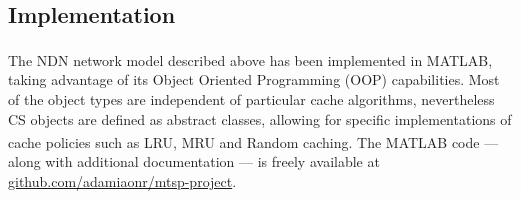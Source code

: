 \subsection{Implementation}
\label{subsec:meth-impl}

The NDN network model described above has been implemented in MATLAB\textsuperscript{\textregistered}, taking 
advantage of its Object Oriented Programming (OOP) capabilities. Most of 
the object types are independent of particular cache algorithms, nevertheless 
CS objects are defined as abstract classes, allowing for specific 
implementations of cache policies such as LRU, MRU and Random caching. The 
MATLAB\textsuperscript{\textregistered} 
code --- along with additional documentation --- is freely available 
at \url{github.com/adamiaonr/mtsp-project}.
